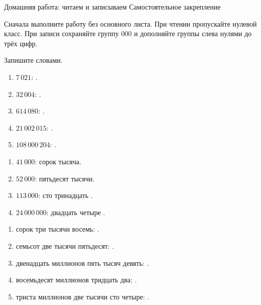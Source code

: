 \worksheettitle
  {Домашняя работа: читаем и записываем}
  { Самостоятельное закрепление}

\studentnameblock

\begin{notebox}
  Сначала выполните работу без основного листа. При чтении пропускайте нулевой
  класс. При записи сохраняйте группу \(000\) и дополняйте группы слева нулями
  до трёх цифр.
\end{notebox}

\begin{practicebox}
  Запишите словами.
  \begin{enumerate}[label=\textbf{\arabic*.}]
    \item \(7\,021\): \answerblank[96mm].
    \item \(32\,004\): \answerblank[92mm].
    \item \(614\,080\): \answerblank[86mm].
    \item \(21\,002\,015\): \answerblank[76mm].
    \item \(108\,000\,204\): \answerblank[70mm].
  \end{enumerate}
\end{practicebox}

\begin{practicebox}
  \begin{enumerate}[label=\textbf{\arabic*.}]
    \item \(41\,000\): сорок \answerblank[14mm] тысяча.
    \item \(52\,000\): пятьдесят \answerblank[14mm] тысячи.
    \item \(113\,000\): сто тринадцать \answerblank[18mm].
    \item \(24\,000\,000\): двадцать четыре \answerblank[20mm].
  \end{enumerate}
\end{practicebox}

\newpage
\begin{practicebox}
  \begin{enumerate}[label=\textbf{\arabic*.}]
    \item сорок три тысячи восемь: \answerblank[45mm].
    \item семьсот две тысячи пятьдесят: \answerblank[45mm].
    \item двенадцать миллионов пять тысяч девять: \answerblank[45mm].
    \item восемьдесят миллионов тридцать два: \answerblank[45mm].
    \item триста миллионов две тысячи сто четыре: \answerblank[45mm].
  \end{enumerate}
\end{practicebox}


